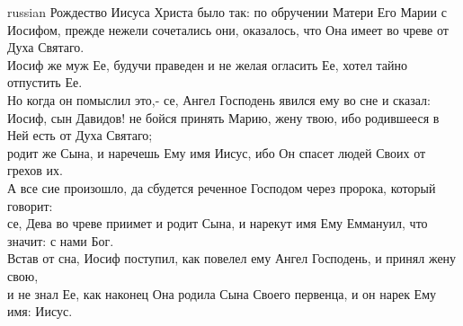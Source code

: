 \documentclass[10pt]{article} %
\begin{document}
{\begin{minipage}[t]{0.47\textwidth}
\begin{otherlanguage*}{russian}
Рождество Иисуса Христа было так: по обручении Матери Его Марии с Иосифом, прежде нежели сочетались они, оказалось, что Она имеет во чреве от Духа Святаго.\\
Иосиф же муж Ее, будучи праведен и не желая огласить Ее, хотел тайно отпустить Ее.\\
Но когда он помыслил это,- се, Ангел Господень явился ему во сне и сказал: Иосиф, сын Давидов! не бойся принять Марию, жену твою, ибо родившееся в Ней есть от Духа Святаго;\\
родит же Сына, и наречешь Ему имя Иисус, ибо Он спасет людей Своих от грехов их.\\
А все сие произошло, да сбудется реченное Господом через пророка, который говорит:\\
се, Дева во чреве приимет и родит Сына, и нарекут имя Ему Еммануил, что значит: с нами Бог.\\
Встав от сна, Иосиф поступил, как повелел ему Ангел Господень, и принял жену свою,\\
и не знал Ее, как наконец Она родила Сына Своего первенца, и он нарек Ему имя: Иисус. \\
\end{otherlanguage*}
\end{minipage}
\hfill
\begin{minipage}[t]{0.47\textwidth}


\end{minipage}}
\end{document}
